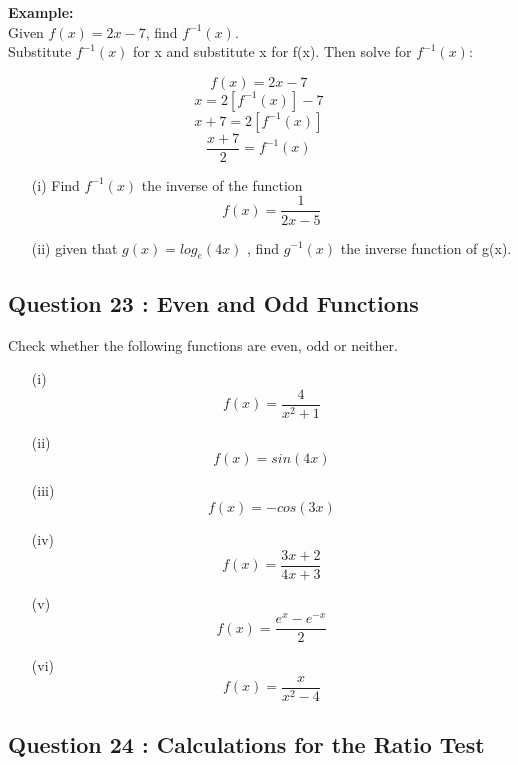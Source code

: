 \documentclass[]{article}
\begin{document}
	\begin{framed}
		
		\noindent	\textbf{Example:}\\ Given $f(x) = 2x - 7$, find $f^{-1}(x)$.
		\\
		\noindent Substitute $f^{-1}(x)$ for x and substitute x for f(x). Then solve for $f^{-1}(x)$:
		
		\[f(x) = 2x - 7\,\]
		\[x  = 2[f^{-1}(x)] - 7\,\]
		\[x + 7  = 2[f^{-1}(x)]\,\]
		\[\frac{x + 7}{2} = f^{-1}(x)\,\]
	\end{framed}
	\begin{itemize}
		\item[(i)] Find $f^{-1}(x)$ the inverse of the function 
		\[f(x) = \frac{1}{2x-5}\]
		\item[(ii)]  given that $g(x) = log_e (4x)$ , find $g^{-1} (x)$ the inverse function of g(x).
	\end{itemize}
	
	
	
	
\subsection*{Question 23 : Even and Odd Functions}
Check whether the following functions are even, odd or neither.
\begin{multicols}{3}
	\begin{itemize}
		\item[(i)] \[f(x) = \frac{4}{x^2+1}\]
		\item[(ii)] \[f(x) = sin(4x) \]
		\item[(iii)] \[f(x) = -cos(3x) \]
		\item[(iv)] \[f(x) = \frac{3x+2}{4x+3} \]
		\item[(v)] \[f(x) =  \frac{e^{x} - e^{-x}}{2}\]
		\item[(vi)] \[f(x) = \frac{x}{x^2-4} \]
	\end{itemize}
\end{multicols}

\subsection*{Question 24 : Calculations for the Ratio Test}
\end{document}
